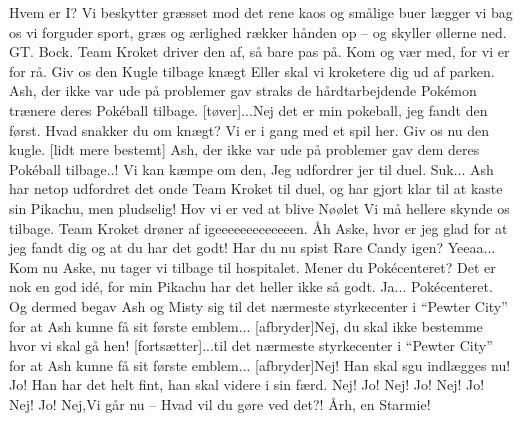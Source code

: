 \documentclass[a4paper,11pt]{article}
\begin{document}
\begin{sketch}
 Hvem er I?
 Vi beskytter græsset mod det rene kaos
 og smålige buer lægger vi bag os
 vi forguder sport, græs og ærlighed
rækker hånden op – og skyller øllerne ned.
GT.
Bock.
Team Kroket driver den af, så bare pas på. Kom og vær med, for vi er for rå.
 Giv os den Kugle tilbage knægt
 Eller skal vi kroketere dig ud af parken.
 Ash, der ikke var ude på problemer gav straks de hårdtarbejdende Pokémon trænere deres Pokéball tilbage.
[tøver]...Nej det er min pokeball, jeg fandt den først.
 Hvad snakker du om knægt?
 Vi er i gang med et spil her.
 Giv os nu den kugle.
[lidt mere bestemt] Ash, der ikke var ude på problemer gav dem deres Pokéball tilbage..!
 Vi kan kæmpe om den, Jeg udfordrer jer til duel.
 Suk... Ash har netop udfordret det onde Team Kroket til duel, og har gjort klar til at kaste sin Pikachu, men pludselig!
 Hov vi er ved at blive Nøølet  Vi må hellere skynde os tilbage.
 Team Kroket drøner af igeeeeeeeeeeeeen.
Åh Aske, hvor er jeg glad for at jeg fandt dig og at du har det godt! Har du nu spist Rare Candy igen?
Yeeaa...
Kom nu Aske, nu tager vi tilbage til hospitalet.
Mener du Pokécenteret? Det er nok en god idé, for min Pikachu har det heller ikke så godt.
Ja... Pokécenteret.
Og dermed begav Ash og Misty sig til det nærmeste styrkecenter i “Pewter City” for at Ash kunne få sit første emblem...
[afbryder]Nej, du skal ikke bestemme hvor vi skal gå hen!
[fortsætter]...til det nærmeste styrkecenter i “Pewter City” for at Ash kunne få sit første emblem...
[afbryder]Nej! Han skal sgu indlægges nu!
Jo! Han har det helt fint, han skal videre i sin færd.
Nej!
Jo!
Nej!
Jo!
Nej!
Jo!
Nej!
Jo!
Nej,Vi går nu -- Hvad vil du gøre ved det?!
Årh, en Starmie!
\end{sketch}
\end{document}
